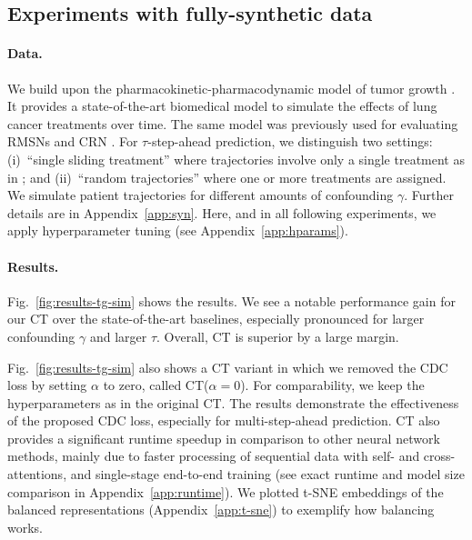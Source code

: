 \documentclass{article}
\theoremstyle{plain}
\theoremstyle{definition}
\theoremstyle{remark}
\newcommand{\shortname}{CT\xspace}
\begin{document}
\subsection{Experiments with fully-synthetic data} \label{sec:tg-sim}

\paragraph{Data.} We build upon the pharmacokinetic-pharmacodynamic model of tumor growth \cite{geng2017prediction}. It provides a state-of-the-art biomedical model to simulate the effects of lung cancer treatments over time. The same model was previously used for evaluating RMSNs \cite{lim2018forecasting} and CRN \cite{bica2020estimating}. For $\tau$-step-ahead prediction, we distinguish two settings: (i)~``single sliding treatment'' where trajectories involve only a single treatment as in \citep{bica2020estimating}; and (ii)~``random trajectories'' where one or more treatments are assigned. We simulate patient trajectories for different amounts of confounding $\gamma$. Further details are in Appendix~\ref{app:syn}. Here, and in all following experiments, we apply hyperparameter tuning (see Appendix~\ref{app:hparams}).




\paragraph{Results.} Fig.~\ref{fig:results-tg-sim} shows the results. We see a notable performance gain for our \shortname over the state-of-the-art baselines, especially pronounced for larger confounding $\gamma$ and larger $\tau$. Overall, \shortname is superior by a large margin. 

Fig.~\ref{fig:results-tg-sim} also shows a \shortname variant in which we removed the CDC loss by setting $\alpha$ to zero, called \shortname($\alpha = 0$). For comparability, we keep the hyperparameters as in the original \shortname. The results demonstrate the effectiveness of the proposed CDC loss, especially for multi-step-ahead prediction. \shortname also provides a significant runtime speedup in comparison to other neural network methods, mainly due to faster processing of sequential data with self- and cross-attentions, and single-stage end-to-end training (see exact runtime and model size comparison in Appendix~\ref{app:runtime}). We plotted t-SNE embeddings of the balanced representations (Appendix~\ref{app:t-sne}) to exemplify how balancing works.
\end{document}
